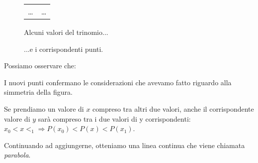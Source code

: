 \begin{figure}[h]
\begin{minipage}[]{.58\textwidth}
\begin{center}
\begin{tabular}{r|l}
    \dots & \dots \\
   \end{tabular}
  \caption{Alcuni valori del trinomio...} \label{tab:tabella1}
  \end{center}
\end{minipage}
\hfill
\begin{minipage}[]{.38\textwidth}
\begin{center}
\begin{inaccessibleblock}
  \puntib
  \caption{...e i corrispondenti punti.}\label{fig:trinomio1}
\end{inaccessibleblock}
\end{center}
\end{minipage}
\end{figure}


Possiamo osservare che:

\begin{enumerate*}
 \item I nuovi punti confermano le considerazioni che avevamo fatto riguardo 
 alla simmetria della figura.
 \item Se prendiamo un valore di \(x\) compreso tra altri due valori, anche 
 il  corrispondente valore di \(y\) sarà compreso tra i due valori di y 
 corrispondenti: \\
 \(x_0 < x <_1 \Rightarrow P(x_0) < P(x) < P(x_1)\).
\end{enumerate*}

Continuando ad aggiungerne, otteniamo una linea continua che viene 
chiamata \emph{parabola}.


